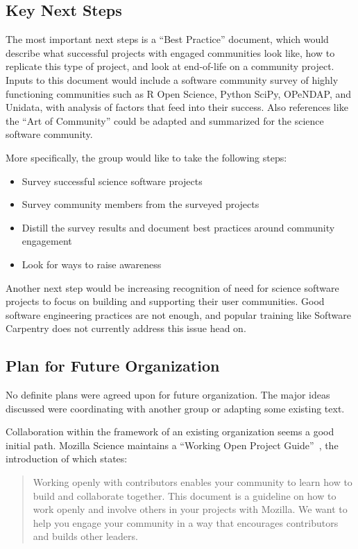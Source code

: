 \subsection{Key Next Steps}

The most important next steps is a ``Best Practice'' document, which would
describe what successful projects with engaged communities look like, how to
replicate this type of project, and look at end-of-life on a community project.
Inputs to this document would include a software community survey of highly
functioning communities such as R Open Science, Python SciPy, OPeNDAP, and
Unidata, with analysis of factors that feed into their success. Also references
like the ``Art of Community'' could be adapted and summarized for the science
software community.

More specifically, the group would like to take the following steps:

\begin{itemize}
\item Survey successful science software projects
\item Survey community members from the surveyed projects
\item Distill the survey results and document best practices around community engagement
\item Look for ways to raise awareness
\end{itemize}

Another next step would be increasing recognition of need for science software
projects to focus on building and supporting their user communities. Good software
engineering practices are not enough, and popular training like Software
Carpentry does not currently address this issue head on.

\subsection{Plan for Future Organization}

No definite plans were agreed upon for future organization. The major ideas discussed
were coordinating with another group or adapting some existing text.

Collaboration within the framework of an existing organization seems a good initial
path. Mozilla Science maintains a ``Working Open Project
Guide''~\cite{working-open-wssspe3}, the introduction of which states:
\begin{quote}
Working openly with contributors enables your community to learn how to build
and collaborate together. This document is a guideline on how to work openly and
involve others in your projects with Mozilla. We want to help you engage your
community in a way that encourages contributors and builds other leaders.
 \end{quote}

